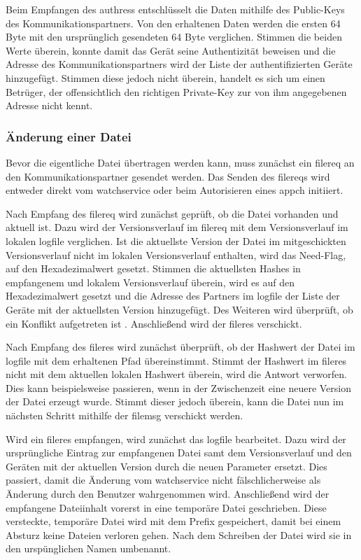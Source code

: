 Beim Empfangen des \gls{authres}s entschlüsselt \sblit die Daten mithilfe des Public-Keys des Kommunikationspartners. Von den erhaltenen Daten werden die ersten 64 Byte mit den ursprünglich gesendeten 64 Byte verglichen. Stimmen die beiden Werte überein, konnte damit das Gerät seine Authentizität beweisen und die Adresse des Kommunikationspartners wird der Liste der authentifizierten Geräte hinzugefügt. Stimmen diese jedoch nicht überein, handelt es sich um einen Betrüger, der offensichtlich den richtigen Private-Key zur von ihm angegebenen Adresse nicht kennt.

\subsubsection{Änderung einer Datei}
Bevor die eigentliche Datei übertragen werden kann, muss zunächst ein \gls{filereq} an den Kommunikationspartner gesendet werden. Das Senden des \gls{filereq}s wird entweder direkt vom \gls{watchservice} oder beim Autorisieren eines \gls{appch} initiiert.

Nach Empfang des \gls{filereq} wird zunächst geprüft, ob die Datei vorhanden und aktuell ist. Dazu wird der Versionsverlauf im \gls{filereq} mit dem Versionsverlauf im lokalen \gls{logfile} verglichen. Ist die aktuellste Version der Datei im mitgeschickten Versionsverlauf nicht im lokalen Versionsverlauf enthalten, wird das Need-Flag, auf den Hexadezimalwert  gesetzt. Stimmen die aktuellsten Hashes in empfangenem und lokalem Versionsverlauf überein, wird es auf den Hexadezimalwert  gesetzt und die Adresse des Partners im \gls{logfile} der Liste der Geräte mit der aktuellsten Version hinzugefügt. Des Weiteren wird überprüft, ob ein Konflikt aufgetreten ist . Anschließend wird der \gls{fileres} verschickt.

Nach Empfang des \gls{fileres} wird zunächst überprüft, ob der Hashwert der Datei im \gls{logfile} mit dem erhaltenen Pfad übereinstimmt. Stimmt der Hashwert im \gls{fileres} nicht mit dem aktuellen lokalen Hashwert überein, wird die Antwort verworfen. Dies kann beispielsweise passieren, wenn in der Zwischenzeit eine neuere Version der Datei erzeugt wurde. Stimmt dieser jedoch überein, kann die Datei nun im nächsten Schritt mithilfe der \gls{filemsg} verschickt werden.

Wird ein \gls{fileres} empfangen, wird zunächst das \gls{logfile} bearbeitet. Dazu wird der ursprüngliche Eintrag zur empfangenen Datei samt dem Versionsverlauf und den Geräten mit der aktuellen Version durch die neuen Parameter ersetzt. Dies passiert, damit die Änderung vom \gls{watchservice} nicht fälschlicherweise als Änderung durch den Benutzer wahrgenommen wird. Anschließend wird der empfangene Dateiinhalt vorerst in eine temporäre Datei geschrieben. Diese versteckte, temporäre Datei wird mit dem Prefix  gespeichert, damit bei einem Absturz keine Dateien verloren gehen. Nach dem Schreiben der Datei wird sie in den urspünglichen Namen umbenannt.

